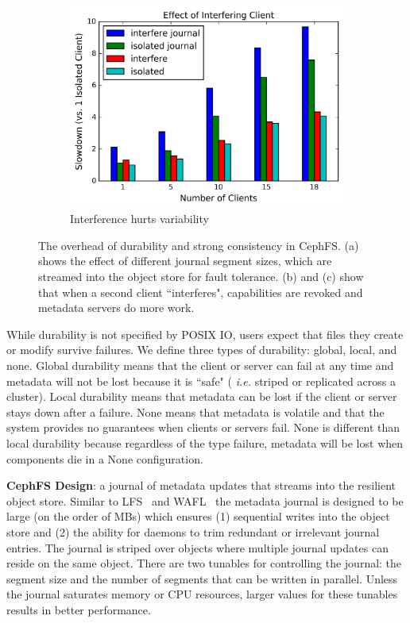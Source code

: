 \begin{figure}[t]
\begin{subfigure}[b]{.3\linewidth}
      \label{fig:overhead-b}
  \end{subfigure}
  \begin{subfigure}[b]{.3\linewidth}
      \centering
      \includegraphics[width=1.0\linewidth]{graphs/slowdown-interfere-scale.png}
      \caption{Interference hurts variability}
      \label{fig:overhead-c}
  \end{subfigure}
  \caption{The overhead of durability and strong consistency in CephFS.
  (a) shows the effect of different journal segment sizes, which are streamed
  into the object store for fault tolerance. (b) and (c) show that when a second
  client ``interferes", capabilities are revoked and metadata servers do more
  work.  \label{fig:overhead}}
\end{figure}

While durability is not specified by POSIX IO, users expect that files they
create or modify survive failures.  We define three types of durability:
global, local, and none.  Global durability means that the client or server can
fail at any time and metadata will not be lost because it is ``safe" ({\it
i.e.} striped or replicated across a cluster). Local durability means that
metadata can be lost if the client or server stays down after a failure. None
means that metadata is volatile and that the system provides no guarantees when
clients or servers fail.  None is different than local durability because
regardless of the type failure, metadata will be lost when components die in a
None configuration.

\textbf{CephFS Design}: a journal of metadata updates that streams into the
resilient object store. Similar to LFS~\cite{rosenblum:acm1992-LFS} and
WAFL~\cite{hitz:wtec1994-WAFL} the metadata journal is designed to be large
(on the order of MBs) which ensures (1) sequential writes into the object store
and (2) the ability for daemons to trim redundant or irrelevant journal
entries.  The journal is striped over objects where multiple journal updates
can reside on the same object. There are two tunables for controlling the
journal: the segment size and the number of segments that can be written in
parallel. Unless the journal saturates memory or CPU resources, larger values
for these tunables results in better performance.

